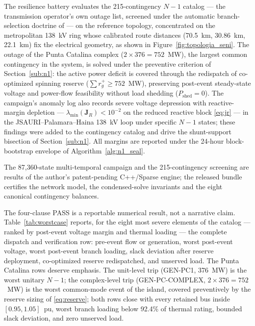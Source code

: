 The resilience battery evaluates the 215-contingency $N-1$ catalog --- the transmission operator's own outage list, screened under the automatic branch-selection doctrine of \cite{ejebe1979} --- on the reference topology, concentrated on the metropolitan 138~kV ring whose calibrated route distances (70.5~km, 30.86~km, 22.1~km) fix the electrical geometry, as shown in Figure~\ref{fig:topologia_seni}. The outage of the Punta Catalina complex ($2 \times 376 = 752$~MW), the largest common contingency in the system, is solved under the preventive criterion of Section~\ref{sub:n1}: the active power deficit is covered through the redispatch of co-optimized spinning reserve ($\sum r_g^+ \ge 752$~MW), preserving post-event steady-state voltage and power-flow feasibility without load shedding ($P_{\mathrm{shed}} = 0$). The campaign's anomaly log also records severe voltage depression with reactive-margin depletion --- $\lambda_{\min}(\mathbf{J}_R) < 10^{-2}$ on the reduced reactive block \eqref{eq:jr} --- in the JSAURI--Palamara--Haina 138~kV loop under specific $N-1$ states; these findings were added to the contingency catalog and drive the shunt-support bisection of Section~\ref{sub:n1}. All margins are reported under the 24-hour block-bootstrap envelope of Algorithm~\ref{alg:n1_seal}.

The 87,360-state multi-temporal campaign and the 215-contingency screening are results of the author's patent-pending C++/Sparse engine; the released bundle certifies the network model, the condensed-solve invariants and the eight canonical contingency balances.

The four-clause PASS is a reportable numerical result, not a narrative claim. Table~\ref{tab:worstcase} reports, for the eight most severe elements of the catalog --- ranked by post-event voltage margin and thermal loading --- the complete dispatch and verification row: pre-event flow or generation, worst post-event voltage, worst post-event branch loading, slack deviation after reserve deployment, co-optimized reserve redispatched, and unserved load. The Punta Catalina rows deserve emphasis. The unit-level trip (GEN-PC1, 376~MW) is the worst unitary $N-1$; the complex-level trip (GEN-PC-COMPLEX, $2 \times 376 = 752$~MW) is the worst common-mode event of the island, covered preventively by the reserve sizing of \eqref{eq:reserve}; both rows close with every retained bus inside $[0.95, 1.05]$~pu, worst branch loading below 92.4\% of thermal rating, bounded slack deviation, and zero unserved load. 

